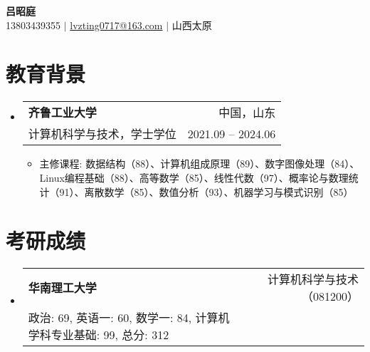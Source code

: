 \documentclass[a4paper,11pt]{ctexart}
\makeatletter
\newenvironment{resumeSubHeadingListStart}{\begin{itemize}[leftmargin=*,label={}]}{\end{itemize}}
\newenvironment{resumeItemListStart}{\begin{itemize}[leftmargin=*,label={}]}{\end{itemize}}
\newcommand{\resumeItem}[1]{
  \item\small{#1}
}
\newcommand{\resumeEducationHeading}[4]{
  \item
  \begin{tabular*}{0.97\textwidth}[t]{l@{\extracolsep{\fill}}r}
    \textbf{#1} & #2 \\
    #3 & #4 \\
  \end{tabular*}
}
\newcommand{\resumeSubheading}[4]{
  \item
  \begin{tabular*}{0.97\textwidth}[t]{l@{\extracolsep{\fill}}r}
    \textbf{#1} & #2 \\
    #3 & #4 \\
  \end{tabular*}
}
\makeatother
\begin{document}
\begin{center}
    {\Huge \textbf{吕昭庭}} \\ \vspace{3pt}
    \small
    \faMobile \hspace{.5pt} 13803439355
    $|$
    \faAt \hspace{.5pt} \href{mailto:lzting0717@163.com}{lvzting0717@163.com}
    $|$
    \faMapMarker \hspace{.5pt} 山西太原
\end{center}
\section{教育背景}
\begin{resumeSubHeadingListStart}
    \resumeEducationHeading
      {齐鲁工业大学}{中国，山东}
      {计算机科学与技术，学士学位 }{2021.09 -- 2024.06}
      \begin{resumeItemListStart}
        \resumeItem{主修课程: 数据结构（88）、计算机组成原理（89）、数字图像处理（84）、Linux编程基础（88）、高等数学（85）、线性代数（97）、概率论与数理统计（91）、离散数学（85）、数值分析（93）、机器学习与模式识别（85）}
      \end{resumeItemListStart}
\end{resumeSubHeadingListStart}
\section{考研成绩}
\begin{resumeSubHeadingListStart}
    \resumeSubheading
      {华南理工大学}{计算机科学与技术（081200）}
      {政治: 69, 英语一: 60, 数学一: 84, 计算机学科专业基础: 99, 总分: 312}{}
\end{resumeSubHeadingListStart}
\end{document}
